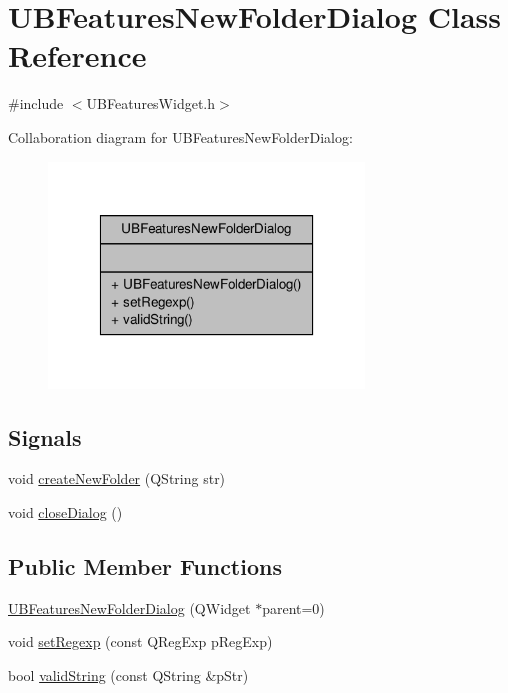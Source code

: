 \hypertarget{class_u_b_features_new_folder_dialog}{\section{U\-B\-Features\-New\-Folder\-Dialog Class Reference}
\label{df/d9d/class_u_b_features_new_folder_dialog}
}


{\ttfamily \#include $<$U\-B\-Features\-Widget.\-h$>$}



Collaboration diagram for U\-B\-Features\-New\-Folder\-Dialog\-:
\nopagebreak
\begin{figure}[H]
\begin{center}
\leavevmode
\includegraphics[width=238pt]{d5/d70/class_u_b_features_new_folder_dialog__coll__graph}
\end{center}
\end{figure}
\subsection*{Signals}
\begin{DoxyCompactItemize}
\item 
void \hyperlink{class_u_b_features_new_folder_dialog_a35dbc1a68965e93e85eb7270bb0ddc77}{create\-New\-Folder} (Q\-String str)
\item 
void \hyperlink{class_u_b_features_new_folder_dialog_a3d742677619d88ea0ec4f94781ed7c2c}{close\-Dialog} ()
\end{DoxyCompactItemize}
\subsection*{Public Member Functions}
\begin{DoxyCompactItemize}
\item 
\hyperlink{class_u_b_features_new_folder_dialog_a6e6992f28e566fc0a321233f8c95b22e}{U\-B\-Features\-New\-Folder\-Dialog} (Q\-Widget $\ast$parent=0)
\item 
void \hyperlink{class_u_b_features_new_folder_dialog_a423d9aeaabc7ecebcf1e127f46ec9f3d}{set\-Regexp} (const Q\-Reg\-Exp p\-Reg\-Exp)
\item 
bool \hyperlink{class_u_b_features_new_folder_dialog_acdc05fa167e124e1e0a53005c3b68a93}{valid\-String} (const Q\-String \&p\-Str)
\end{DoxyCompactItemize}


